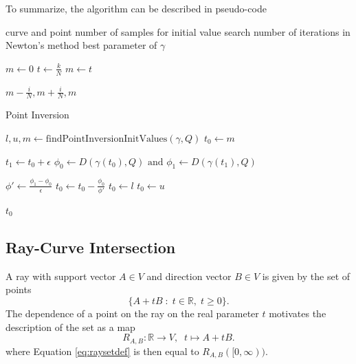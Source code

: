 \documentclass[a4paper, 11pt]{report}
\theoremstyle{definition}
\newcommand{\Desc}[2]{\State \makebox[12em][l]{#1}#2}
\begin{document}
	To summarize, the algorithm can be described in pseudo-code
	\begin{algorithm}[H]
		\begin{algorithmic}[1]
			\Input
				\Desc{$\gamma, Q$}{curve and point}
				\Desc{$N$}{number of samples for initial value search}
				\Desc{$M$}{number of iterations in Newton's method}
			\EndInput
			\Output
				\Desc{$t^*$}{best parameter of $\gamma$}
			\EndOutput
			
				\State $m \gets 0$
					\State $t \gets \frac{k}{N}$
						$m \gets t$
					\EndIf
				\EndFor

				\Return $m-\frac{i}{N}, m+\frac{i}{N}, m$
			\EndProcedure

			\caption{Point Inversion}\label{alg:pointinversion}
				\State $l, u, m \gets \text{findPointInversionInitValues}(\gamma, Q)$
				\State $t_0 \gets m$

					\State $t_1 \gets t_0 + \epsilon$
					\State $\phi_0 \gets D(\gamma(t_0), Q) \text{ and } \phi_1 \gets D(\gamma(t_1), Q)$
					
					\State $\phi' \gets \frac{\phi_1 - \phi_0}{\epsilon}$
					\State $t_0 \gets t_0 - \frac{\phi_0}{\phi'}$
					 $t_0 \gets l$ \EndIf
					 $t_0 \gets u$ \EndIf

				\EndFor

				\Return $t_0$
			\EndProcedure
		\end{algorithmic}
	\end{algorithm}

\subsection{Ray-Curve Intersection}
	A ray with support vector $A \in V$ and direction vector $B \in V$ is given by the set of points
		\begin{equation}\label{eq:raysetdef}
			\{A + tB \;:\; t \in \mathbb{R},\; t \geq 0\}.
		\end{equation}
	The dependence of a point on the ray on the real parameter $t$ motivates the description of the set as a map
		$$R_{A,B}: \mathbb{R} \rightarrow V,\;\; t \mapsto A+tB.$$
	where Equation \ref{eq:raysetdef} is then equal to $R_{A,B}([0,\infty))$.
\end{document}
